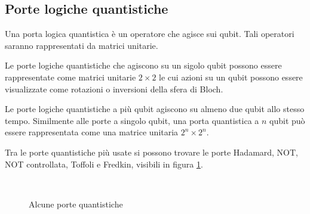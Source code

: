 \subsection{Porte logiche quantistiche} \label{sec:porte_quantistiche}

\begin{definition}
    Una porta logica quantistica è un operatore che agisce sui qubit. Tali operatori 
    saranno rappresentati da matrici unitarie. 
\end{definition}
Le porte logiche quantistiche che agiscono su un sigolo qubit possono essere 
rappresentate come matrici unitarie $2 \times 2$ le cui azioni 
su un qubit possono essere visualizzate come rotazioni o inversioni 
della sfera di Bloch. 

Le porte logiche quantistiche a più qubit agiscono su almeno due qubit 
allo stesso tempo. Similmente alle porte a singolo qubit, una porta quantistica 
a $n$ qubit può essere rappresentata come una matrice unitaria $2^n\times2^n$. 

Tra le porte quantistiche più usate si possono trovare le porte Hadamard, 
NOT, NOT controllata, Toffoli e Fredkin, visibili in figura \ref{fig:porte_1}. 
\begin{figure}[ht!]
    \myfloatalign
     \quad
     \quad
     \\ 
     \quad 
    
    \caption{Alcune porte quantistiche}
    \label{fig:porte_1}
\end{figure}

